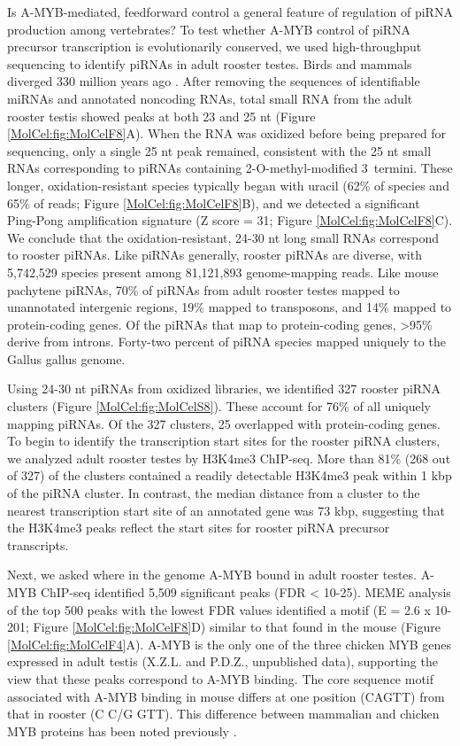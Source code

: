     Is A-MYB-mediated, feedforward control a general feature of regulation of piRNA production among vertebrates? To test whether A-MYB control of piRNA precursor transcription is evolutionarily conserved, we used high-throughput sequencing to identify piRNAs in adult rooster testes. Birds and mammals diverged 330 million years ago \citep{Benton2007}. After removing the sequences of identifiable miRNAs \citep{Burnside2008} and annotated noncoding RNAs, total small RNA from the adult rooster testis showed peaks at both 23 and 25 nt (Figure \ref{MolCel:fig:MolCelF8}A). When the RNA was oxidized before being prepared for sequencing, only a single 25 nt peak remained, consistent with the 25 nt small RNAs corresponding to piRNAs containing 2\textprime-O-methyl-modified 3\textprime~termini. These longer, oxidation-resistant species typically began with uracil (62\% of species and 65\% of reads; Figure \ref{MolCel:fig:MolCelF8}B), and we detected a significant Ping-Pong amplification signature (Z score = 31; Figure \ref{MolCel:fig:MolCelF8}C). We conclude that the oxidation-resistant, 24-30 nt long small RNAs correspond to rooster piRNAs. Like piRNAs generally, rooster piRNAs are diverse, with 5,742,529 species present among 81,121,893 genome-mapping reads. Like mouse pachytene piRNAs, 70\% of piRNAs from adult rooster testes mapped to unannotated intergenic regions, 19\% mapped to transposons, and 14\% mapped to protein-coding genes. Of the piRNAs that map to protein-coding genes, >95\% derive from introns. Forty-two percent of piRNA species mapped uniquely to the Gallus gallus genome.

    Using 24-30 nt piRNAs from oxidized libraries, we identified 327 rooster piRNA clusters (Figure \ref{MolCel:fig:MolCelS8}). These account for 76\% of all uniquely mapping piRNAs. Of the 327 clusters, 25 overlapped with protein-coding genes. To begin to identify the transcription start sites for the rooster piRNA clusters, we analyzed adult rooster testes by H3K4me3 ChIP-seq. More than 81\% (268 out of 327) of the clusters contained a readily detectable H3K4me3 peak within 1 kbp of the piRNA cluster. In contrast, the median distance from a cluster to the nearest transcription start site of an annotated gene was 73 kbp, suggesting that the H3K4me3 peaks reflect the start sites for rooster piRNA precursor transcripts.

    Next, we asked where in the genome A-MYB bound in adult rooster testes. A-MYB ChIP-seq identified 5,509 significant peaks (FDR < 10-25). MEME analysis of the top 500 peaks with the lowest FDR values identified a motif (E = 2.6 x 10-201; Figure \ref{MolCel:fig:MolCelF8}D) similar to that found in the mouse (Figure \ref{MolCel:fig:MolCelF4}A). A-MYB is the only one of the three chicken MYB genes expressed in adult testis (X.Z.L. and P.D.Z., unpublished data), supporting the view that these peaks correspond to A-MYB binding. The core sequence motif associated with A-MYB binding in mouse differs at one position (CAGTT) from that in rooster (C C/G GTT). This difference between mammalian and chicken MYB proteins has been noted previously \citep{Weston1992, Deng1996}.


